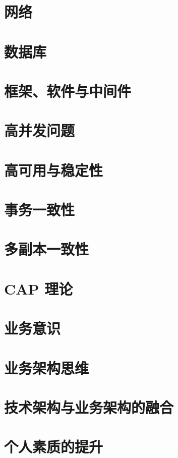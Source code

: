 \documentclass[cn,normal,11pt]{../elegantnote}
\begin{document}
\section{网络}

\section{数据库}

\section{框架、软件与中间件}

\section{高并发问题}

\section{高可用与稳定性}

\section{事务一致性}

\section{多副本一致性}

\section{CAP 理论}

\section{业务意识}

\section{业务架构思维}

\section{技术架构与业务架构的融合}

\section{个人素质的提升}
\end{document}
